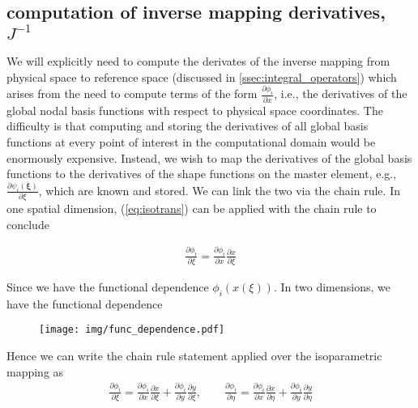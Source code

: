 \documentclass[10pt]{article}
\begin{document}
\subsection{computation of inverse mapping derivatives, $J^{-1}$}

We will explicitly need to compute the derivates of the inverse mapping from physical space to
reference space (discussed in \ref{ssec:integral_operators}) which arises from the need to compute
terms of the form $\frac{\partial \phi_i}{\partial x}$, i.e., the derivatives of the global nodal
basis functions with respect to physical space coordinates. The difficulty is that computing and
storing the derivatives of all global basis functions at every point of interest in the
computational domain would be enormously expensive. Instead, we wish to map the derivatives of the
global basis functions to the derivatives of the shape functions on the master element, e.g.,
$\frac{\partial \psi_i(\bm{\xi})}{\partial \xi}$, which are known and stored. We can link the two
via the chain rule. In one spatial dimension, (\ref{eq:isotrans}) can be applied with the chain rule
to conclude

\begin{align}
  \frac{\partial \phi_i}{\partial \xi} 
  = \frac{\partial \phi_i}{\partial x} \frac{\partial x}{\partial \xi}
\end{align}

Since we have the functional dependence $\phi_i(x(\xi))$. In two dimensions, we have the functional
dependence 

\begin{figure}[thp!]
  \centering \texttt{[image: img/func\_dependence.pdf]}
\end{figure}

Hence we can write the chain rule statement applied over the isoparametric mapping as 
\begin{align}
  \frac{\partial \phi_i}{\partial \xi}
  = \frac{\partial \phi_i}{\partial x} \frac{\partial x}{\partial \xi}
  + \frac{\partial \phi_i}{\partial y} \frac{\partial y}{\partial \xi}, \qquad
  \frac{\partial \phi_i}{\partial \eta}
  = \frac{\partial \phi_i}{\partial x} \frac{\partial x}{\partial \eta}
  + \frac{\partial \phi_i}{\partial y} \frac{\partial y}{\partial \eta}
\end{align}
\end{document}
